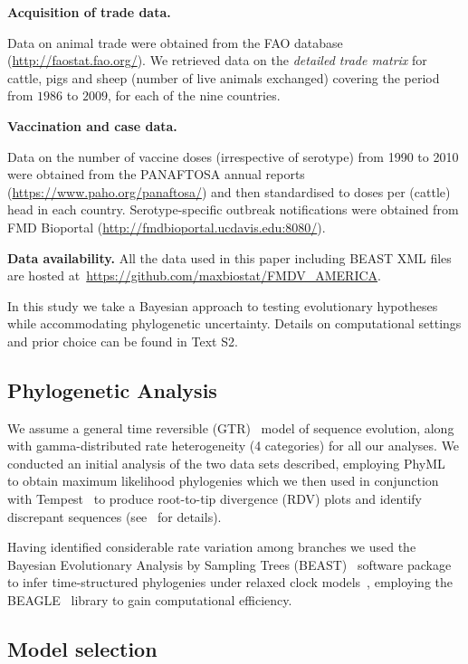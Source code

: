 \documentclass[10pt]{article}
\begin{document}
\textbf{Acquisition of trade data.}

Data on animal trade were obtained from the FAO database (\url{http://faostat.fao.org/}).
We retrieved data on the \textit{detailed trade matrix} for cattle, pigs and sheep (number of live animals exchanged) covering the period from $1986$ to $2009$, for each of the nine countries.

\textbf{Vaccination and case data.}

Data on the number of vaccine doses (irrespective of serotype) from 1990 to 2010 were obtained from the PANAFTOSA annual reports (\url{https://www.paho.org/panaftosa/}) and then standardised to doses per (cattle) head in each country.
Serotype-specific outbreak notifications were obtained from FMD Bioportal (\url{http://fmdbioportal.ucdavis.edu:8080/}).

\textbf{Data availability.} All the data used in this paper including BEAST XML files are hosted at~\url{https://github.com/maxbiostat/FMDV_AMERICA}.


In this study we take a Bayesian approach to testing evolutionary hypotheses while accommodating phylogenetic uncertainty.
Details on computational settings and prior choice can be found in Text S2.
\subsection*{Phylogenetic Analysis}

We assume a general time reversible (GTR)~\citep{Tavare1986} model of sequence evolution, along with gamma-distributed rate heterogeneity (4 categories) for all our analyses.
We conducted an initial analysis of the two data sets described, employing PhyML~\citep{Guindon2003} to obtain maximum likelihood phylogenies which we then used in conjunction with Tempest~\citep{Rambaut2016} to produce root-to-tip divergence (RDV) plots and identify discrepant sequences (see~\cite{Rambaut2016} for details).

Having identified considerable rate variation among branches we used the Bayesian Evolutionary Analysis by Sampling Trees (BEAST)~\citep{Drummond2012,Suchard2018} software package to infer time-structured phylogenies under relaxed clock models~\citep{Drummond2006}, employing the BEAGLE~\citep{Ayres2012} library to gain computational efficiency.

\subsection*{Model selection}
\end{document}
